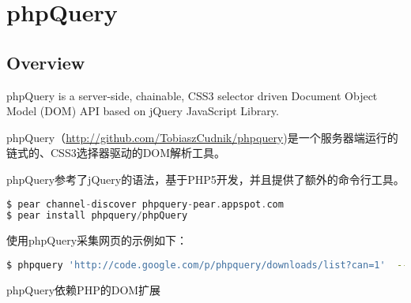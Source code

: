 \part{phpQuery}

\chapter{Overview}


phpQuery is a server-side, chainable, CSS3 selector driven Document Object Model (DOM) API based on jQuery JavaScript Library.

phpQuery（\url{http://github.com/TobiaszCudnik/phpquery})是一个服务器端运行的链式的、CSS3选择器驱动的DOM解析工具。

phpQuery参考了jQuery的语法，基于PHP5开发，并且提供了额外的命令行工具。





\begin{lstlisting}[language=PHP]
$ pear channel-discover phpquery-pear.appspot.com 
$ pear install phpquery/phpQuery
\end{lstlisting}


使用phpQuery采集网页的示例如下：


\begin{lstlisting}[language=bash]
$ phpquery 'http://code.google.com/p/phpquery/downloads/list?can=1'  --find '.vt.col_4 a' --contents --getString null array_sum
\end{lstlisting}



phpQuery依赖PHP的DOM扩展


